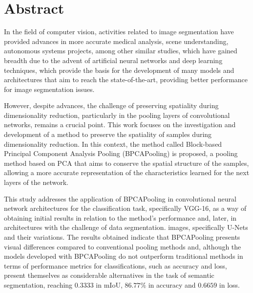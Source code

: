 \section*{Abstract}
\thispagestyle{empty}
In the field of computer vision, activities related to image segmentation have provided advances in more accurate medical analysis, scene understanding, autonomous systems projects, among other similar studies, which have gained breadth due to the advent of artificial neural networks and deep learning techniques, which provide the basis for the development of many models and architectures that aim to reach the state-of-the-art, providing better performance for image segmentation issues.

However, despite advances, the challenge of preserving spatiality during dimensionality reduction, particularly in the pooling layers of convolutional networks, remains a crucial point. This work focuses on the investigation and development of a method to preserve the spatiality of samples during dimensionality reduction. In this context, the method called Block-based Principal Component Analysis Pooling (BPCAPooling) is proposed, a pooling method based on PCA that aims to conserve the spatial structure of the samples, allowing a more accurate representation of the characteristics learned for the next layers of the network.

This study addresses the application of BPCAPooling in convolutional neural network architectures for the classification task, specifically VGG-16, as a way of obtaining initial results in relation to the method's performance and, later, in architectures with the challenge of data segmentation. images, specifically U-Nets and their variations. The results obtained indicate that BPCAPooling presents visual differences compared to conventional pooling methods and, although the models developed with BPCAPooling do not outperform traditional methods in terms of performance metrics for classifications, such as accuracy and loss, present themselves as considerable alternatives in the task of semantic segmentation, reaching $0.3333$ in mIoU, $86.77\%$ in accuracy and $0.6659$ in loss.